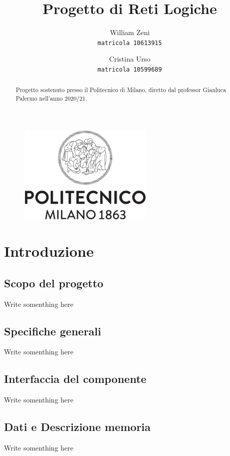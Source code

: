 \documentclass{article}
\title{Progetto di Reti Logiche}
\author{
  William Zeni\\
  \texttt{matricola 10613915}
  \and
  Cristina Urso\\
  \texttt{matricola 10599689}
}
\begin{document}
\maketitle

\renewcommand{\abstractname}{ }
\begin{abstract}
  \centering
  Progetto sostenuto presso il Politecnico di Milano, diretto dal professor Gianluca Palermo nell'anno 2020/21.
\end{abstract}

\begin{figure}[b]
  \centering
  \vspace{3cm}
  \includegraphics[width=65mm , height= 47mm]{Logo_Politecnico_Milano.png}
\end{figure}


\pagebreak
\tableofcontents
\pagebreak


\section{Introduzione} %
\subsection{Scopo del progetto} %
Write somenthing here

\subsection{Specifiche generali} %
Write somenthing here

\subsection{Interfaccia del componente} %
Write somenthing here

\subsection{Dati e Descrizione memoria} %
Write somenthing here
\end{document}
